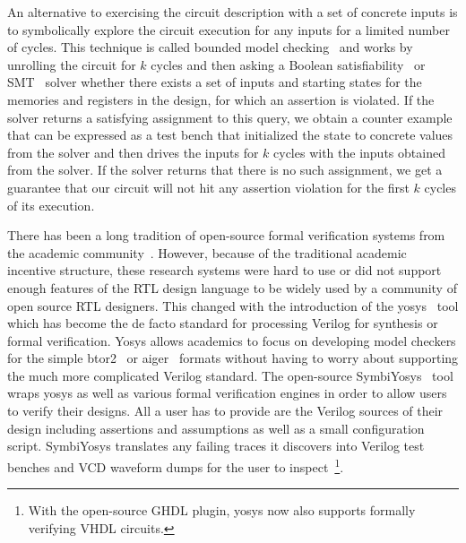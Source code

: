 \documentclass[conference]{IEEEtran}
\begin{document}
An alternative to exercising the circuit description with a set of concrete inputs is to symbolically explore the circuit execution
for any inputs for a limited number of cycles.
This technique is called bounded model checking~\cite{bmc} and works by unrolling the circuit for $k$ cycles and then asking a 
Boolean satisfiability~\cite{sat} or SMT~\cite{smt} solver whether there exists a set of inputs and starting states for the memories and registers in the
design, for which an assertion is violated.
If the solver returns a satisfying assignment to this query, we obtain a counter example that can be expressed as a test bench that
initialized the state to concrete values from the solver and then drives the inputs for $k$ cycles with the inputs obtained from the solver.
If the solver returns that there is no such assignment, we get a guarantee that our circuit will not hit any assertion violation for the first $k$
cycles of its execution.



There has been a long tradition of open-source formal verification systems from the academic community~\cite{mcmillan1993smv, cimatti2000nusmv, mishchenko2007abc}.
However, because of the traditional academic incentive structure, these research systems were hard to use or did not support
enough features of the RTL design language to be widely used by a community of open source RTL designers.
This changed with the introduction of the yosys~\cite{Yosys} tool which has become the de facto standard for processing
Verilog for synthesis or formal verification.
Yosys allows academics to focus on developing model checkers for the simple btor2~\cite{btor2} or aiger~\cite{aiger} formats
without having to worry about supporting the much more complicated Verilog standard.
The open-source SymbiYosys~\cite{symbiyosys} tool wraps yosys as well as various formal verification engines in order to allow users to
verify their designs. All a user has to provide are the Verilog sources of their design including assertions and assumptions
as well as a small configuration script. SymbiYosys translates any failing traces it discovers into Verilog test benches and VCD waveform dumps
for the user to inspect~\footnote{With the open-source GHDL plugin, yosys now also supports formally verifying VHDL circuits.}.
\end{document}
